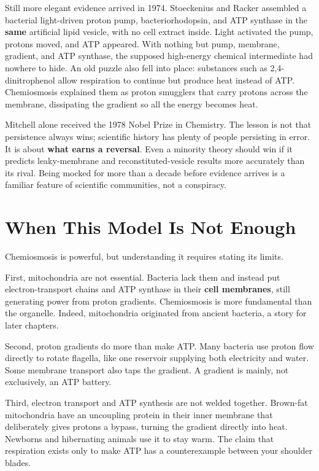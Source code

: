 \begin{zhengju}
Still more elegant evidence arrived in 1974. Stoeckenius and Racker assembled a bacterial light-driven proton pump, bacteriorhodopsin, and ATP synthase in the \textbf{same} artificial lipid vesicle, with no cell extract inside. Light activated the pump, protons moved, and ATP appeared. With nothing but pump, membrane, gradient, and ATP synthase, the supposed high-energy chemical intermediate had nowhere to hide. An old puzzle also fell into place: substances such as 2,4-dinitrophenol allow respiration to continue but produce heat instead of ATP. Chemiosmosis explained them as proton smugglers that carry protons across the membrane, dissipating the gradient so all the energy becomes heat.

Mitchell alone received the 1978 Nobel Prize in Chemistry. The lesson is not that persistence always wins; scientific history has plenty of people persisting in error. It is about \textbf{what earns a reversal}. Even a minority theory should win if it predicts leaky-membrane and reconstituted-vesicle results more accurately than its rival. Being mocked for more than a decade before evidence arrives is a familiar feature of scientific communities, not a conspiracy.
\end{zhengju}

\section{When This Model Is Not Enough}

Chemiosmosis is powerful, but understanding it requires stating its limits.

First, mitochondria are not essential. Bacteria lack them and instead put electron-transport chains and ATP synthase in their \textbf{cell membranes}, still generating power from proton gradients. Chemiosmosis is more fundamental than the organelle. Indeed, mitochondria originated from ancient bacteria, a story for later chapters.

Second, proton gradients do more than make ATP. Many bacteria use proton flow directly to rotate flagella, like one reservoir supplying both electricity and water. Some membrane transport also taps the gradient. A gradient is mainly, not exclusively, an ATP battery.

Third, electron transport and ATP synthesis are not welded together. Brown-fat mitochondria have an uncoupling protein in their inner membrane that deliberately gives protons a bypass, turning the gradient directly into heat. Newborns and hibernating animals use it to stay warm. The claim that respiration exists only to make ATP has a counterexample between your shoulder blades.

